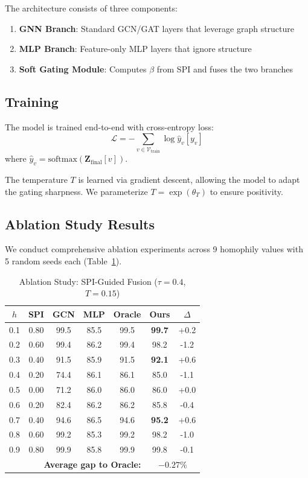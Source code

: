 The architecture consists of three components:
\begin{enumerate}
    \item \textbf{GNN Branch}: Standard GCN/GAT layers that leverage graph structure
    \item \textbf{MLP Branch}: Feature-only MLP layers that ignore structure
    \item \textbf{Soft Gating Module}: Computes $\beta$ from SPI and fuses the two branches
\end{enumerate}

\subsection{Training}

The model is trained end-to-end with cross-entropy loss:
\begin{equation}
    \mathcal{L} = -\sum_{v \in \mathcal{V}_{\text{train}}} \log \hat{y}_v[y_v]
\end{equation}
where $\hat{y}_v = \text{softmax}(\mathbf{Z}_{\text{final}}[v])$.

The temperature $T$ is learned via gradient descent, allowing the model to adapt the gating sharpness. We parameterize $T = \exp(\theta_T)$ to ensure positivity.

\subsection{Ablation Study Results}

We conduct comprehensive ablation experiments across 9 homophily values with 5 random seeds each (Table~\ref{tab:ablation_v2}).

\begin{table}[t]
\centering
\caption{Ablation Study: SPI-Guided Fusion ($\tau=0.4$, $T=0.15$)}
\label{tab:ablation_v2}
\small
\begin{tabular}{@{}ccccccc@{}}
\toprule
$h$ & SPI & GCN & MLP & Oracle & \textbf{Ours} & $\Delta$ \\
\midrule
0.1 & 0.80 & 99.5 & 85.5 & 99.5 & \textbf{99.7} & +0.2 \\
0.2 & 0.60 & 99.4 & 86.2 & 99.4 & 98.2 & -1.2 \\
0.3 & 0.40 & 91.5 & 85.9 & 91.5 & \textbf{92.1} & +0.6 \\
0.4 & 0.20 & 74.4 & 86.1 & 86.1 & 85.0 & -1.1 \\
0.5 & 0.00 & 71.2 & 86.0 & 86.0 & 86.0 & +0.0 \\
0.6 & 0.20 & 82.4 & 86.2 & 86.2 & 85.8 & -0.4 \\
0.7 & 0.40 & 94.6 & 86.5 & 94.6 & \textbf{95.2} & +0.6 \\
0.8 & 0.60 & 99.2 & 85.3 & 99.2 & 98.2 & -1.0 \\
0.9 & 0.80 & 99.9 & 85.8 & 99.9 & 99.8 & -0.1 \\
\midrule
\multicolumn{5}{r}{\textbf{Average gap to Oracle:}} & \multicolumn{2}{c}{$-0.27\%$} \\
\bottomrule
\end{tabular}
\end{table}

